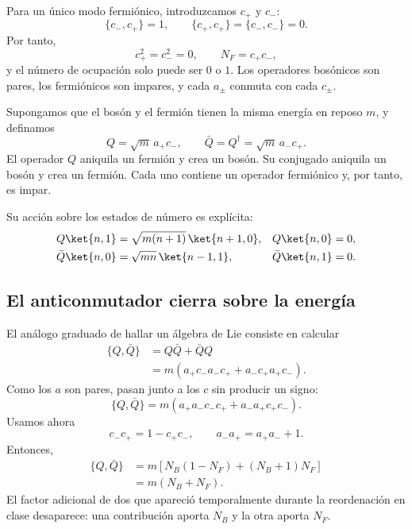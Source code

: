 Para un único modo fermiónico, introduzcamos \(c_+\) y \(c_-\):
\begin{equation}
\{c_-,c_+\}=1,
\qquad
\{c_+,c_+\}=\{c_-,c_-\}=0.
\end{equation}
Por tanto,
\begin{equation}
c_+^2=c_-^2=0,
\qquad
N_F=c_+c_-,
\end{equation}
y el número de ocupación solo puede ser \(0\) o \(1\). Los operadores bosónicos son pares, los fermiónicos son impares, y cada \(a_\pm\) conmuta con cada \(c_\pm\).


Supongamos que el bosón y el fermión tienen la misma energía en reposo \(m\), y definamos
\begin{equation}
Q=\sqrt m\,a_+c_-,
\qquad
\bar Q=Q^\dagger=\sqrt m\,a_-c_+.
\end{equation}
El operador \(Q\) aniquila un fermión y crea un bosón. Su conjugado aniquila un bosón y crea un fermión. Cada uno contiene un operador fermiónico y, por tanto, es impar.

Su acción sobre los estados de número es explícita:
\begin{align}
Q\ket{n,1}
&=\sqrt{m(n+1)}\,\ket{n+1,0},
&
Q\ket{n,0}&=0,\\
\bar Q\ket{n,0}
&=\sqrt{mn}\,\ket{n-1,1},
&
\bar Q\ket{n,1}&=0.
\end{align}

\subsection{El anticonmutador cierra sobre la energía}

El análogo graduado de hallar un álgebra de Lie consiste en calcular
\begin{align}
\{Q,\bar Q\}
&=Q\bar Q+\bar Q Q\\
&=m\left(a_+c_-a_-c_+
        +a_-c_+a_+c_-\right).
\end{align}
Como los \(a\) son pares, pasan junto a los \(c\) sin producir un signo:
\begin{equation}
\{Q,\bar Q\}
=m\left(a_+a_-c_-c_+
        +a_-a_+c_+c_-\right).
\end{equation}
Usamos ahora
\begin{equation}
c_-c_+=1-c_+c_-,
\qquad
a_-a_+=a_+a_-+1.
\end{equation}
Entonces,
\begin{align}
\{Q,\bar Q\}
&=m\left[
N_B(1-N_F)+(N_B+1)N_F
\right]\\
&=m(N_B+N_F).
\end{align}
El factor adicional de dos que apareció temporalmente durante la reordenación en clase desaparece: una contribución aporta \(N_B\) y la otra aporta \(N_F\).

